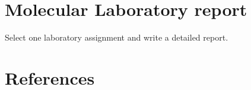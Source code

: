 \documentclass[
  letterpaper,
  DIV=11,
  numbers=noendperiod]{scrreprt}
\begin{document}

\chapter{Molecular Laboratory report}\label{molecular-laboratory-report}

Select one laboratory assignment and write a detailed report.


\chapter*{References}\label{references}

\end{document}
